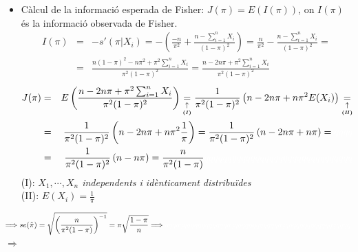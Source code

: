 \documentclass[12pt]{article}
\begin{document}
\begin{itemize}
\item Càlcul de la informació esperada de Fisher: $J(\pi)=E(I(\pi))$, on $I(\pi)$ és la informació observada de Fisher.
\begin{align*}
I(\pi) & = & -s'(\pi|X_i) = -\left( \frac{-n}{\pi^2} + \frac{n - \sum_{i=1}^n X_i}{(1-\pi)^2} \right) = \frac{n}{\pi^2} - \frac{n - \sum_{i=1}^n X_i}{(1-\pi)^2} = \\
& = &\frac{n(1-\pi)^2-n\pi^2+\pi^2\sum_{i=1}^n X_i}{\pi^2(1-\pi)^2} = \frac{n-2n\pi +\pi^2\sum_{i=1}^n X_i}{\pi^2(1-\pi)^2}
\end{align*}
\begin{align*}
J(\pi) & = & E\left( \frac{n-2n\pi +\pi^2\sum_{i=1}^n X_i}{\pi^2(1-\pi)^2}\right)\underset{\underset{\textbf{(\textit{I})}}{\uparrow}}{=}\frac{1}{\pi^2(1-\pi)^2}\left( n-2n\pi +n\pi^2E(X_i) \right) \underset{\underset{\textbf{(\textit{II})}}{\uparrow}}{=}\\
& = & \frac{1}{\pi^2(1-\pi)^2}\left( n-2n\pi +n\pi^2\frac{1}{\pi} \right) = \frac{1}{\pi^2(1-\pi)^2} \left( n-2n\pi +n\pi \right) = \textcolor{white}{qqqq} \\
& = &\frac{1}{\pi^2(1-\pi)^2} \left( n-n\pi \right) = \frac{n}{\pi^2(1-\pi)} \textcolor{white}{qqqqqqqqqqqqqqqqqqqqqqqqqqqqqqqq}
\end{align*}
(I): \textit{$X_1, \cdots , X_n$ independents i idènticament distribuïdes}\\
(II): \textit{$E(X_i)=\frac{1}{\pi}$}
\end{itemize}
\begin{multline*}
\Longrightarrow se(\hat{\pi}) = \sqrt{\left( \frac{n}{\pi^2(1-\pi)} \right)^{-1}} = \pi\sqrt{\frac{1-\pi}{n}} \Longrightarrow \textcolor{white}{qqqqqqqqqqqqqqqqqqqqqqqqqqqqqqqqqqqqqqqqqqqqqqqqqqq}
\end{multline*}
\label{se}
$\Longrightarrow$ 
\newpage
\end{document}
